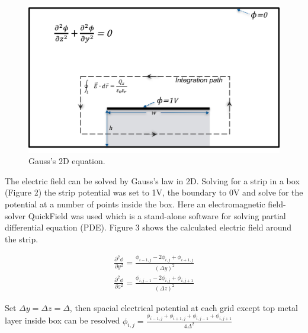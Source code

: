 \documentclass[11pt,final]{scrbook}
\begin{document}
\begin{figure}[htbp]
\begin{center}
\includegraphics[scale=0.5]{Gauss2D.pdf}
\caption{Gauss's 2D equation.}
\label{fig:Gauss2D}
\end{center}
\end{figure}

The electric field can be solved by Gauss’s law in 2D. Solving for a strip in a box (Figure 2) the strip potential was set to 1V, the boundary to 0V and solve for the potential at a number of points inside the box. Here an electromagnetic field-solver QuickField was used which is a stand-alone software for solving partial differential equation (PDE). Figure 3 shows the calculated electric field around the strip.

\begin{align}
\frac { { \partial  }^{ 2 }\phi  }{ \partial { y }^{ 2 } } =\frac { { \phi  }_{ i-1,j }-2{ \phi  }_{ i,j }+{ \phi  }_{ i+1,j } }{ { (\Delta y) }^{ 2 } }\\
\frac { { \partial  }^{ 2 }\phi  }{ \partial { z }^{ 2 } } =\frac { { \phi  }_{ i,j-1 }-2{ \phi  }_{ i,j }+{ \phi  }_{ i,j+1 } }{ { (\Delta z) }^{ 2 } }
\end{align}

Set $\Delta y=\Delta z=\Delta$, then spacial electrical potential at each grid except top metal layer inside box can be resolved $ { \phi  }_{ i,j }=\frac { { \phi  }_{ i-1,j }+{ \phi  }_{ i+1,j }+{ \phi  }_{ i,j-1 }+{ \phi  }_{ i,j+1 } }{ 4\Delta ^{ 2 } } $
\end{document}
